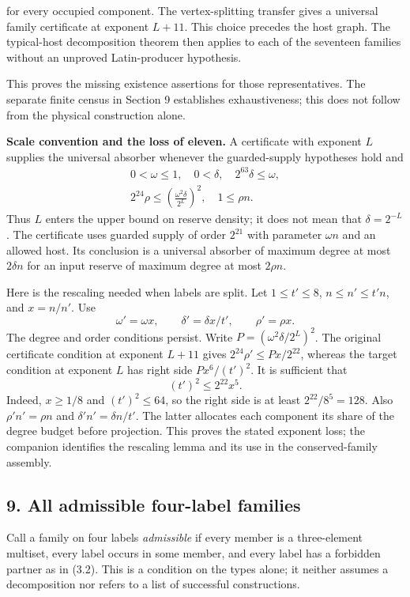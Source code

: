 \documentclass[english,11pt,a4paper]{article}
\begin{document}
for every occupied component. The vertex-splitting transfer gives a universal family certificate at exponent \(L+11\). This choice precedes the host graph. The typical-host decomposition theorem then applies to each of the seventeen families without an unproved Latin-producer hypothesis.

This proves the missing existence assertions for those representatives. The separate finite census in Section 9 establishes exhaustiveness; this does not follow from the physical construction alone.

\textbf{Scale convention and the loss of eleven.} A certificate with exponent \(L\) supplies the universal absorber whenever the guarded-supply hypotheses hold and \[\begin{gathered}
0<\omega\le1,\quad 0<\delta,\quad 2^{63}\delta\le\omega,\\
2^{24}\rho\le\left(\frac{\omega^2\delta}{2^L}\right)^2,
\quad 1\le\rho n.
\end{gathered}\] Thus \(L\) enters the upper bound on reserve density; it does not mean that \(\delta=2^{-L}\). The certificate uses guarded supply of order \(2^{21}\) with parameter \(\omega n\) and an allowed host. Its conclusion is a universal absorber of maximum degree at most \(2\delta n\) for an input reserve of maximum degree at most \(2\rho n\).

Here is the rescaling needed when labels are split. Let \(1\le t'\le8\), \(n\le n'\le t'n\), and \(x=n/n'\). Use \[\omega'=\omega x,\qquad \delta'=\delta x/t',\qquad \rho'=\rho x.\] The degree and order conditions persist. Write \(P=(\omega^2\delta/2^L)^2\). The original certificate condition at exponent \(L+11\) gives \(2^{24}\rho'\le Px/2^{22}\), whereas the target condition at exponent \(L\) has right side \(Px^6/(t')^2\). It is sufficient that \[(t')^2\le2^{22}x^5.\] Indeed, \(x\ge1/8\) and \((t')^2\le64\), so the right side is at least \(2^{22}/8^5=128\). Also \(\rho'n'=\rho n\) and \(\delta'n'=\delta n/t'\). The latter allocates each component its share of the degree budget before projection. This proves the stated exponent loss; the companion identifies the rescaling lemma and its use in the conserved-family assembly.

\subsection{9. All admissible four-label families}\label{all-admissible-four-label-families}

Call a family on four labels \emph{admissible} if every member is a three-element multiset, every label occurs in some member, and every label has a forbidden partner as in (3.2). This is a condition on the types alone; it neither assumes a decomposition nor refers to a list of successful constructions.
\end{document}
